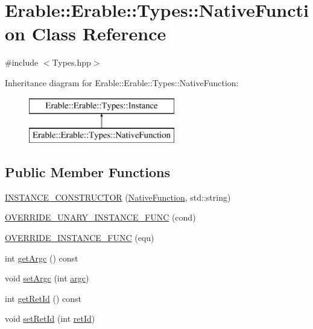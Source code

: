 \hypertarget{class_erable_1_1_erable_1_1_types_1_1_native_function}{}\section{Erable\+::Erable\+::Types\+::Native\+Function Class Reference}
\label{class_erable_1_1_erable_1_1_types_1_1_native_function}


{\ttfamily \#include $<$Types.\+hpp$>$}

Inheritance diagram for Erable\+::Erable\+::Types\+::Native\+Function\+:\begin{figure}[H]
\begin{center}
\leavevmode
\includegraphics[height=2.000000cm]{class_erable_1_1_erable_1_1_types_1_1_native_function}
\end{center}
\end{figure}
\subsection*{Public Member Functions}
\begin{DoxyCompactItemize}
\item 
\mbox{\hyperlink{class_erable_1_1_erable_1_1_types_1_1_native_function_a112b2497c6761c95eb6ea3c0f3be2863}{I\+N\+S\+T\+A\+N\+C\+E\+\_\+\+C\+O\+N\+S\+T\+R\+U\+C\+T\+OR}} (\mbox{\hyperlink{class_erable_1_1_erable_1_1_types_1_1_native_function}{Native\+Function}}, std\+::string)
\item 
\mbox{\hyperlink{class_erable_1_1_erable_1_1_types_1_1_native_function_a6485ef45154a529da963a224573810fb}{O\+V\+E\+R\+R\+I\+D\+E\+\_\+\+U\+N\+A\+R\+Y\+\_\+\+I\+N\+S\+T\+A\+N\+C\+E\+\_\+\+F\+U\+NC}} (cond)
\item 
\mbox{\hyperlink{class_erable_1_1_erable_1_1_types_1_1_native_function_ae8a39155f61d6b3361e33eb54395185b}{O\+V\+E\+R\+R\+I\+D\+E\+\_\+\+I\+N\+S\+T\+A\+N\+C\+E\+\_\+\+F\+U\+NC}} (equ)
\item 
int \mbox{\hyperlink{class_erable_1_1_erable_1_1_types_1_1_native_function_a53c94df1a7e39bbba52119fdab1c9db0}{get\+Argc}} () const
\item 
void \mbox{\hyperlink{class_erable_1_1_erable_1_1_types_1_1_native_function_a9d5d92192f3b4e4e48dffd755ff2508b}{set\+Argc}} (int \mbox{\hyperlink{class_erable_1_1_erable_1_1_types_1_1_native_function_a659837466841d70c21d19c634803ead1}{argc}})
\item 
int \mbox{\hyperlink{class_erable_1_1_erable_1_1_types_1_1_native_function_abfeefff4c94e828d2723f4cb584644f6}{get\+Ret\+Id}} () const
\item 
void \mbox{\hyperlink{class_erable_1_1_erable_1_1_types_1_1_native_function_a0b5291b8a842f40245095243c54b4231}{set\+Ret\+Id}} (int \mbox{\hyperlink{class_erable_1_1_erable_1_1_types_1_1_native_function_ad5f6d7c2844c638734c962b19668e859}{ret\+Id}})
\end{DoxyCompactItemize}
